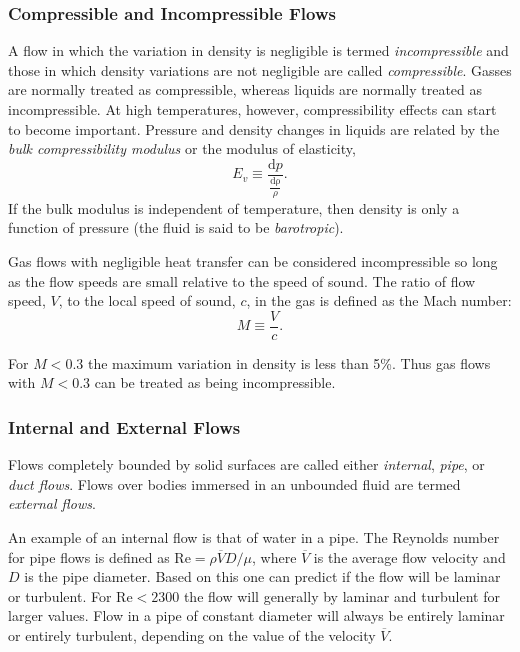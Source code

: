 \subsubsection{Compressible and Incompressible Flows}
A flow in which the variation in density is negligible is termed \textit{incompressible} and those in which density variations are not negligible are called \textit{compressible}. Gasses are normally treated as compressible, whereas liquids are normally treated as incompressible. At high temperatures, however, compressibility effects can start to become important. Pressure and density changes in liquids are related by the \textit{bulk compressibility modulus} or the modulus of elasticity,
\[ 
E_v \equiv \frac{\mathrm{d}p}{\frac{\mathrm{d\rho}}{\rho}}
.\]
If the bulk modulus is independent of temperature, then density is only a function of pressure (the fluid is said to be \textit{barotropic}).

Gas flows with negligible heat transfer can be considered incompressible so long as the flow speeds are small relative to the speed of sound. The ratio of flow speed, $V$, to the local speed of sound, $c$, in the gas is defined as the Mach number:
\[ 
M \equiv \frac{V}{c}
.\]

For $M < \num{0,3} $ the maximum variation in density is less than 5\%. Thus gas flows with $M<\num{0,3} $ can be treated as being incompressible.


\subsubsection{Internal and External Flows}
Flows completely bounded by solid surfaces are called either \textit{internal}, \textit{pipe}, or \textit{duct flows}. Flows over bodies immersed in an unbounded fluid are termed \textit{external flows}.

An example of an internal flow is that of water in a pipe. The Reynolds number for pipe flows is defined as $\mathrm{Re} = \rho \overline{V} D / \mu$, where $\overline{V}$ is the average flow velocity and $D$ is the pipe diameter. Based on this one can predict if the flow will be laminar or turbulent. For $\mathrm{Re} < \num{2300} $ the flow will generally by laminar and turbulent for larger values. Flow in a pipe of constant diameter will always be entirely laminar or entirely turbulent, depending on the value of the velocity $\overline{V}$.
